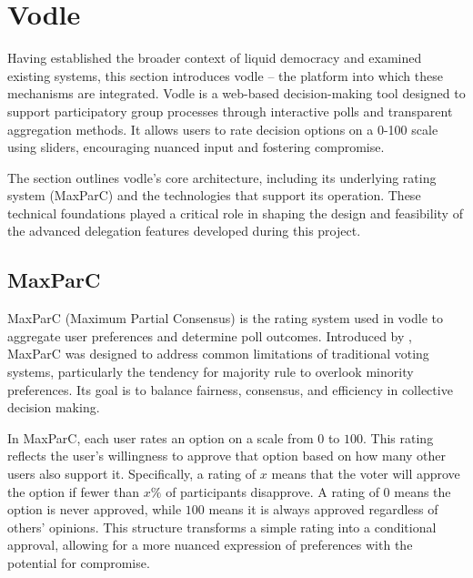 \section{Vodle}
Having established the broader context of liquid democracy and examined existing systems, this section introduces vodle -- the platform into which these mechanisms are integrated.
Vodle is a web-based decision-making tool designed to support participatory group processes through interactive polls and transparent aggregation methods. It allows users to rate decision options on a 0-100 scale using sliders, encouraging nuanced input and fostering compromise.

The section outlines vodle's core architecture, including its underlying rating system (MaxParC) and the technologies that support its operation. These technical foundations played a critical role in shaping the design and feasibility of the advanced delegation features developed during this project.

\subsection{MaxParC}\label{subsec:background_maxparc}
MaxParC (Maximum Partial Consensus) is the rating system used in vodle to aggregate user preferences and determine poll outcomes. Introduced by \citet{heitzig_fair_2024}, MaxParC was designed to address common limitations of traditional voting systems, particularly the tendency for majority rule to overlook minority preferences. Its goal is to balance fairness, consensus, and efficiency in collective decision making.

In MaxParC, each user rates an option on a scale from $0$ to $100$. This rating reflects the user's willingness to approve that option based on how many other users also support it. Specifically, a rating of $x$ means that the voter will approve the option if fewer than $x\%$ of participants disapprove. A rating of $0$ means the option is never approved, while $100$ means it is always approved regardless of others' opinions. This structure transforms a simple rating into a conditional approval, allowing for a more nuanced expression of preferences with the potential for compromise.

